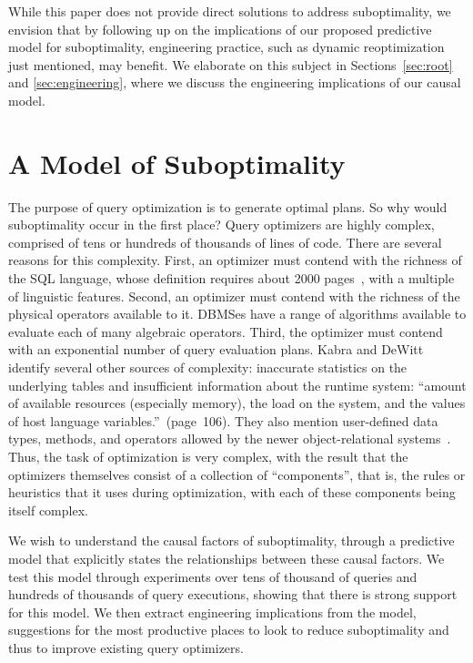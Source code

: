 \documentclass[prodmode,acmtods]{acmsmall}
\begin{document}
While this paper does not provide direct solutions to address
suboptimality, we envision that by following up on the implications of our proposed predictive model
for suboptimality, engineering practice, such as dynamic reoptimization just
mentioned, may benefit. We elaborate on this subject in
Sections~\ref{sec:root} and \ref{sec:engineering}, where we discuss the engineering implications
of our causal model.

\section{A Model of Suboptimality}\label{sec:model}

The purpose of query optimization is to generate optimal plans.  So
why would suboptimality occur in the first place? Query optimizers are
highly complex, comprised of tens or hundreds of thousands of lines of code. There
are several reasons for this complexity. First, an optimizer must
contend with the richness of the SQL language, whose definition
requires about 2000 pages~\cite{SQL2008}, with a multiple of
linguistic features. Second, an optimizer must contend with the
\hbox{richness} of the physical operators available to it. \hbox{DBMSes} have a
range of algorithms available to evaluate each of many algebraic
operators. Third, the optimizer must contend with an exponential
number of query evaluation plans. Kabra and DeWitt~\cite{kabra98}
identify several other sources of complexity: inaccurate statistics on
the underlying tables and insufficient information about the runtime
system: ``amount of available resources (especially memory), the load
on the system, and the values of host language
variables.''~(page~106). They also mention user-defined data types,
methods, and operators allowed by the newer object-relational
systems~\cite{Melton03}. Thus, the task of optimization is very
complex, with the result that the optimizers themselves consist of a
collection of ``components'', that is, the rules or heuristics that it
uses during optimization, with each of these components being itself
complex.

We wish to understand the causal factors of suboptimality, through a
predictive model that explicitly states the relationships between these
causal factors. We test this model through experiments over tens of thousand
of queries and hundreds of thousands of query executions, showing that there
is strong support for this model. We then extract engineering implications
from the model, suggestions for the most productive places to look to reduce
suboptimality and thus to improve existing query optimizers.
\end{document}
